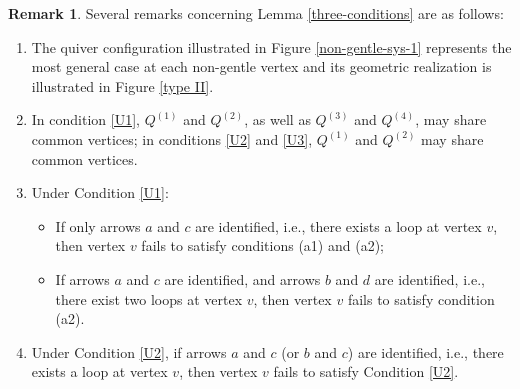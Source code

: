 \documentclass[11pt]{amsart}
\numberwithin{equation}{section}
\theoremstyle{definition}
\newtheorem{remark}[theorem]{Remark}
\begin{document}
\begin{remark}
Several remarks concerning Lemma \ref{three-conditions} are as follows:
\begin{enumerate}
    \item The quiver configuration illustrated in Figure \ref{non-gentle-sys-1} represents the most general case at each non-gentle vertex and its geometric realization is illustrated in Figure \ref{type II}.

    \item In condition \ref{U1}, $Q^{(1)}$ and $Q^{(2)}$, as well as $Q^{(3)}$ and $Q^{(4)}$, may share common vertices; in conditions \ref{U2} and \ref{U3}, $Q^{(1)}$ and $Q^{(2)}$ may share common vertices.

    \item Under Condition \ref{U1}:
    \begin{itemize}
        \item If only arrows $a$ and $c$ are identified, i.e., there exists a loop at vertex $v$, then vertex $v$ fails to satisfy conditions (a1) and (a2);
        \item If arrows $a$ and $c$ are identified, and arrows $b$ and $d$ are identified, i.e., there exist two loops at vertex $v$, then vertex $v$ fails to satisfy condition (a2).
    \end{itemize}

    \item Under Condition \ref{U2}, if arrows $a$ and $c$ (or $b$ and $c$) are identified, i.e., there exists a loop at vertex $v$, then vertex $v$ fails to satisfy Condition \ref{U2}.
\end{enumerate}
\begin{figure}[htbp]
	\begin{center}
\end{center}
\end{figure}
\end{remark}
\end{document}
